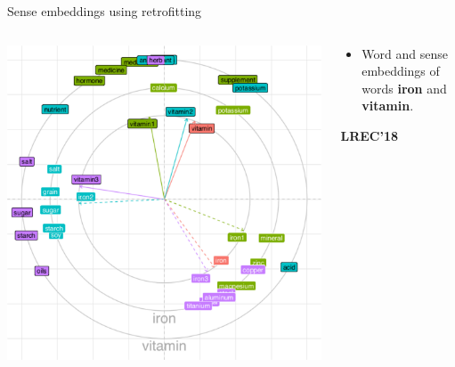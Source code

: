 \begin{frame}{Sense embeddings using retrofitting}
\vspace{-1em}
\begin{columns}
\begin{column}{0.55\textwidth}
\includegraphics[height=0.68\textheight]{figures/bullseye}
\end{column}

\begin{column}{.45\textwidth}
{ \footnotesize

\begin{itemize}

\item Word and sense embeddings of words \textbf{iron} and  \textbf{vitamin}.

\end{itemize}

\textbf{LREC'18}~\cite{remus:2018}

}
\end{column}
\end{columns}

\end{frame}




